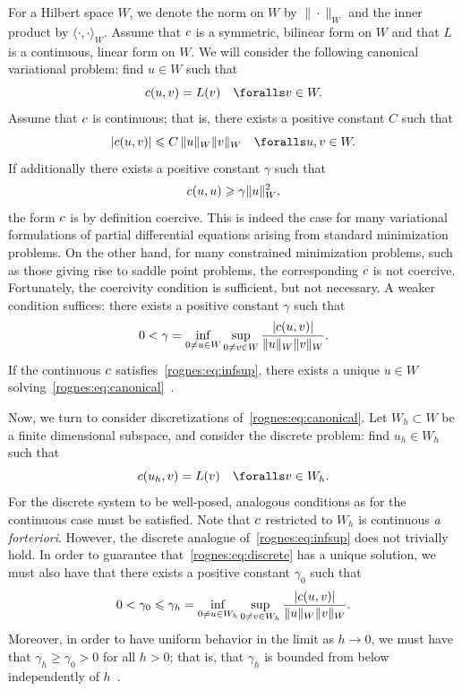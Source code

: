 For a Hilbert space $W$, we denote the norm on $W$ by
$\|\cdot\|_{W}$ and the inner product by $\langle \cdot, \cdot
\rangle_{W}$. Assume that $c$ is a symmetric, bilinear
form on $W$ and that $L$ is a continuous, linear form on
$W$. We will consider the following canonical variational
problem: find $u \in W$ such that
\begin{equation}
  \label{rognes:eq:canonical}
  \rognesc(u, v) = L(v) \quad \foralls v \in W.
\end{equation}
Assume that $c$ is continuous; that is, there exists a positive
constant $C$ such that
\begin{equation}
  |\rognesc(u, v)| \leqslant C \, \|u\|_{W} \|v\|_{W}
  \quad \foralls u, v \in W.
\end{equation}
If additionally there exists a positive constant $\gamma$ such that
\begin{equation}
  c(u, u) \geqslant \gamma \|u\|_{W}^2,
\end{equation}
the form $c$ is by definition coercive. This is indeed the case
for many variational formulations of partial differential equations
arising from standard minimization problems. On the other hand, for
many constrained minimization problems, such as those giving rise to
saddle point problems, the corresponding $c$ is not coercive.
Fortunately, the coercivity condition is sufficient, but not
necessary. A weaker condition suffices: there exists a positive
constant $\gamma$ such that
\begin{equation}
  \label{rognes:eq:infsup}
  0 < \gamma = \inf_{0 \not = u \in W} \sup_{0 \not = v \in W}
  \frac{|c(u,  v)|}{\|u\|_{W}\|v\|_{W}}.
\end{equation}
If the continuous $c$ satisfies~\eqref{rognes:eq:infsup}, there
exists a unique $u \in W$
solving~\eqref{rognes:eq:canonical}~\citep{Babuvska1972/73}.

Now, we turn to consider discretizations
of~\eqref{rognes:eq:canonical}. Let $W_h \subset W$ be a
finite dimensional subspace, and consider the discrete problem: find
$u_h \in W_h$ such that
\begin{equation}
  \label{rognes:eq:discrete}
  \rognesc(u_h, v) = L(v) \quad \foralls v \in W_h.
\end{equation}
For the discrete system to be well-posed, analogous conditions as for
the continuous case must be satisfied. Note that $c$ restricted
to $W_h$ is continuous \emph{a forteriori}. However, the discrete
analogue of~\eqref{rognes:eq:infsup} does not trivially hold. In order
to guarantee that~\eqref{rognes:eq:discrete} has a unique solution, we
must also have that there exists a positive constant $\gamma_0$ such
that
\begin{equation}
  \label{rognes:eq:infsup:discrete}
  0 < \gamma_0 \leqslant \gamma_h = \inf_{0 \not = u \in W_h} \sup_{0
    \not = v \in W_h} \frac{|c(u, v)|}{\|u\|_{W}\|v\|_{W}}.
\end{equation}
Moreover, in order to have uniform behavior in the limit as $h
\rightarrow 0$, we must have that $\gamma_h \geqslant \gamma_0 > 0$ for all
$h > 0$; that is, that $\gamma_h$ is bounded from below independently
of $h$~\citep{Babuvska1972/73}.

